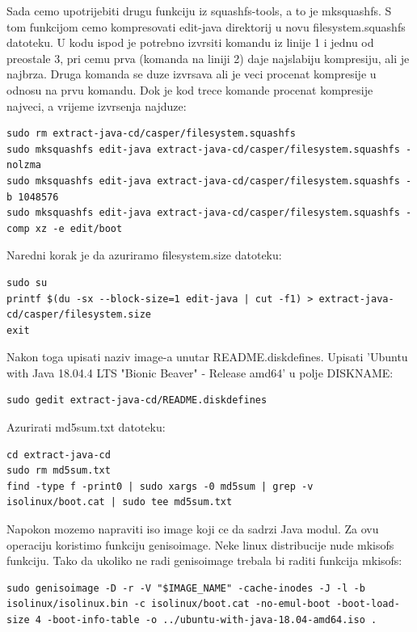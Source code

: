 \documentclass[12pt,vi]{mitthesis}
\begin{document}
\noindent
Sada cemo upotrijebiti drugu funkciju iz squashfs-tools, a to je mksquashfs. S tom funkcijom cemo kompresovati edit-java direktorij u novu filesystem.squashfs datoteku. U kodu ispod je potrebno izvrsiti komandu iz linije 1 i jednu od preostale 3, pri cemu prva (komanda na liniji 2) daje najslabiju kompresiju, ali je najbrza. Druga komanda se duze izvrsava ali je veci procenat kompresije u odnosu na prvu komandu. Dok je kod trece komande procenat kompresije najveci, a vrijeme izvrsenja najduze:
\begin{lstlisting}[style=BashInputStyle]
sudo rm extract-java-cd/casper/filesystem.squashfs
sudo mksquashfs edit-java extract-java-cd/casper/filesystem.squashfs -nolzma 
sudo mksquashfs edit-java extract-java-cd/casper/filesystem.squashfs -b 1048576
sudo mksquashfs edit-java extract-java-cd/casper/filesystem.squashfs -comp xz -e edit/boot
\end{lstlisting}

\noindent
Naredni korak je da azuriramo filesystem.size datoteku:
\begin{lstlisting}[style=BashInputStyle]
sudo su
printf $(du -sx --block-size=1 edit-java | cut -f1) > extract-java-cd/casper/filesystem.size
exit
\end{lstlisting}

\noindent
Nakon toga upisati naziv image-a unutar README.diskdefines. 
Upisati 'Ubuntu with Java 18.04.4 LTS "Bionic Beaver" - Release amd64' u polje DISKNAME:
\begin{lstlisting}[style=BashInputStyle]
sudo gedit extract-java-cd/README.diskdefines
\end{lstlisting}

\noindent
Azurirati md5sum.txt datoteku:
\begin{lstlisting}[style=BashInputStyle]
cd extract-java-cd
sudo rm md5sum.txt
find -type f -print0 | sudo xargs -0 md5sum | grep -v isolinux/boot.cat | sudo tee md5sum.txt
\end{lstlisting}

\noindent
Napokon mozemo napraviti iso image koji ce da sadrzi Java modul. Za ovu operaciju koristimo funkciju genisoimage. Neke linux distribucije nude mkisofs funkciju. Tako da ukoliko ne radi genisoimage trebala bi raditi funkcija mkisofs:
\begin{lstlisting}[style=BashInputStyle]
sudo genisoimage -D -r -V "$IMAGE_NAME" -cache-inodes -J -l -b isolinux/isolinux.bin -c isolinux/boot.cat -no-emul-boot -boot-load-size 4 -boot-info-table -o ../ubuntu-with-java-18.04-amd64.iso .
\end{lstlisting}
\end{document}
